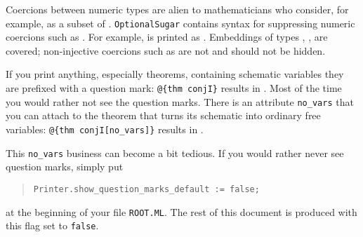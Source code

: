 \begin{isabellebody}
\begin{isamarkuptext}
\begin{itemize}
\end{itemize}%
\end{isamarkuptext}%
\isamarkuptrue%
%
\isamarkuptrue%
%
\begin{isamarkuptext}%
Coercions between numeric types are alien to mathematicians who
consider, for example,  as a subset of .
\texttt{OptionalSugar} contains syntax for suppressing numeric coercions such
as   . For example,
 is printed as . Embeddings of types
, ,  are covered; non-injective coercions such
as    are not and should not be
hidden.%
\end{isamarkuptext}%
\isamarkuptrue%
%
\isamarkuptrue%
%
\isamarkuptrue%
%
\begin{isamarkuptext}%
If you print anything, especially theorems, containing
schematic variables they are prefixed with a question mark:
\verb!@!\verb!{thm conjI}! results in . Most of the time
you would rather not see the question marks. There is an attribute
\verb!no_vars! that you can attach to the theorem that turns its
schematic into ordinary free variables: \verb!@!\verb!{thm conjI[no_vars]}!
results in .

This \verb!no_vars! business can become a bit tedious.
If you would rather never see question marks, simply put
\begin{quote}
\verb|Printer.show_question_marks_default := false|\verb!;!
\end{quote}
at the beginning of your file \texttt{ROOT.ML}.
The rest of this document is produced with this flag set to \texttt{false}.


\end{isamarkuptext}
\end{isabellebody}
